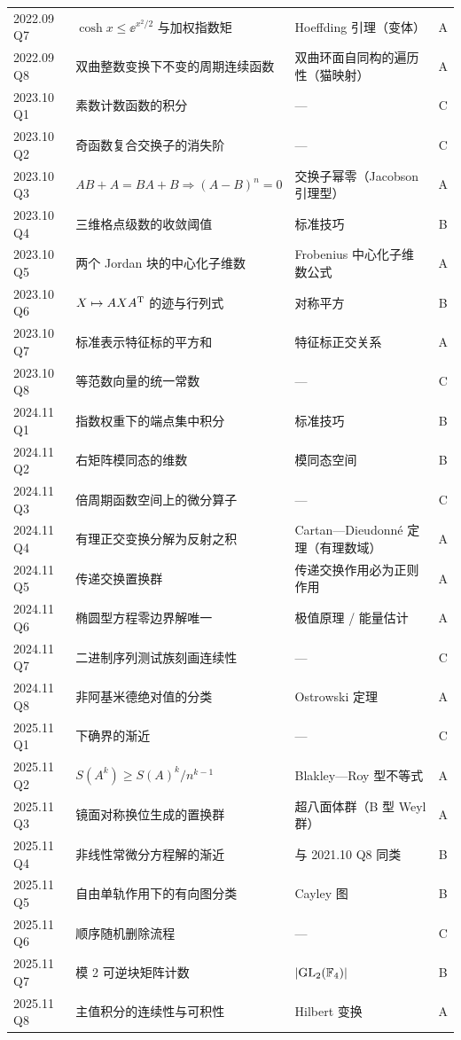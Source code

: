 \documentclass[cjk=noto, nomargin]{mojing-notes}
\begin{document}
{\begin{longtable}{p{2.2cm}p{4.6cm}p{5.3cm}c}
2022.09 Q7 & $\cosh x\le\ee^{x^2/2}$ 与加权指数矩 & Hoeffding 引理（变体） & A \\
2022.09 Q8 & 双曲整数变换下不变的周期连续函数 & 双曲环面自同构的遍历性（猫映射） & A \\
2023.10 Q1 & 素数计数函数的积分 & — & C \\
2023.10 Q2 & 奇函数复合交换子的消失阶 & — & C \\
2023.10 Q3 & $AB+A=BA+B\Rightarrow(A-B)^n=0$ & 交换子幂零（Jacobson 引理型） & A \\
2023.10 Q4 & 三维格点级数的收敛阈值 & 标准技巧 & B \\
2023.10 Q5 & 两个 Jordan 块的中心化子维数 & Frobenius 中心化子维数公式 & A \\
2023.10 Q6 & $X\mapsto AXA^{\mathrm{T}}$ 的迹与行列式 & 对称平方 & B \\
2023.10 Q7 & 标准表示特征标的平方和 & 特征标正交关系 & A \\
2023.10 Q8 & 等范数向量的统一常数 & — & C \\
2024.11 Q1 & 指数权重下的端点集中积分 & 标准技巧 & B \\
2024.11 Q2 & 右矩阵模同态的维数 & 模同态空间 & B \\
2024.11 Q3 & 倍周期函数空间上的微分算子 & — & C \\
2024.11 Q4 & 有理正交变换分解为反射之积 & Cartan—Dieudonné 定理（有理数域） & A \\
2024.11 Q5 & 传递交换置换群 & 传递交换作用必为正则作用 & A \\
2024.11 Q6 & 椭圆型方程零边界解唯一 & 极值原理 / 能量估计 & A \\
2024.11 Q7 & 二进制序列测试族刻画连续性 & — & C \\
2024.11 Q8 & 非阿基米德绝对值的分类 & Ostrowski 定理 & A \\
2025.11 Q1 & 下确界的渐近 & — & C \\
2025.11 Q2 & $S(A^k)\ge S(A)^k/n^{k-1}$ & Blakley—Roy 型不等式 & A \\
2025.11 Q3 & 镜面对称换位生成的置换群 & 超八面体群（B 型 Weyl 群） & A \\
2025.11 Q4 & 非线性常微分方程解的渐近 & 与 2021.10 Q8 同类 & B \\
2025.11 Q5 & 自由单轨作用下的有向图分类 & Cayley 图 & B \\
2025.11 Q6 & 顺序随机删除流程 & — & C \\
2025.11 Q7 & 模 2 可逆块矩阵计数 & $\lvert\mathrm{GL}_2(\mathbb{F}_4)\rvert$ & B \\
2025.11 Q8 & 主值积分的连续性与可积性 & Hilbert 变换 & A \\
\bottomrule
\end{longtable}
}
\end{document}
